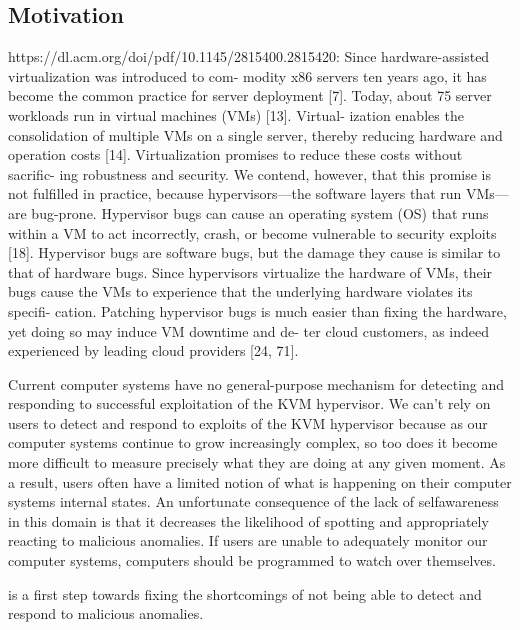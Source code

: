 \documentclass{report}
\begin{document}
\begin{spacing}{1.5}
\section{Motivation}
https://dl.acm.org/doi/pdf/10.1145/2815400.2815420:
Since hardware-assisted virtualization was introduced to com-
modity x86 servers ten years ago, it has become the common
practice for server deployment [7]. Today, about 75%
server workloads run in virtual machines (VMs) [13]. Virtual-
ization enables the consolidation of multiple VMs on a single
server, thereby reducing hardware and operation costs [14].
Virtualization promises to reduce these costs without sacrific-
ing robustness and security. We contend, however, that this
promise is not fulfilled in practice, because hypervisors—the
software layers that run VMs—are bug-prone. Hypervisor
bugs can cause an operating system (OS) that runs within a
VM to act incorrectly, crash, or become vulnerable to security
exploits [18].
Hypervisor bugs are software bugs, but the damage they
cause is similar to that of hardware bugs. Since hypervisors
virtualize the hardware of VMs, their bugs cause the VMs to
experience that the underlying hardware violates its specifi-
cation. Patching hypervisor bugs is much easier than fixing
the hardware, yet doing so may induce VM downtime and de-
ter cloud customers, as indeed experienced by leading cloud
providers [24, 71].





{\large
Current computer systems have no general-purpose mechanism for
detecting and responding to successful exploitation of the KVM hypervisor. We can't rely on users to detect and respond to exploits of the KVM hypervisor because as our computer systems continue to grow increasingly complex, so too does it
become more difficult to measure precisely what they are doing at any given moment.
As a result, users often have a limited notion of what is happening on their computer
systems internal states. An unfortunate consequence of the lack of selfawareness in
this domain is that it decreases the likelihood of spotting and appropriately reacting
to malicious anomalies. If users are unable to adequately monitor our computer
systems, computers should be programmed to watch over themselves.





is a first step towards fixing the shortcomings of not being able to detect and respond to malicious anomalies. 
\newline
}







\end{spacing}
\end{document}
